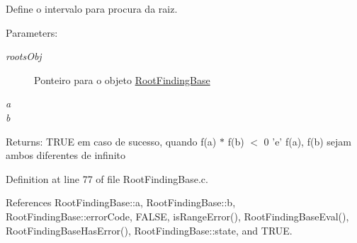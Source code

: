 Define o intervalo para procura da raiz. 

\begin{Desc}
\item[Parameters:]
\begin{description}
\item[{\em rootsObj}]Ponteiro para o objeto \hyperlink{structRootFindingBase}{RootFindingBase} \item[{\em a}]\item[{\em b}]\end{description}
\end{Desc}
\begin{Desc}
\item[Returns:]TRUE em caso de sucesso, quando f(a) $\ast$ f(b) $<$ 0 'e' f(a), f(b) sejam ambos diferentes de infinito \end{Desc}


Definition at line 77 of file RootFindingBase.c.

References RootFindingBase::a, RootFindingBase::b, RootFindingBase::errorCode, FALSE, isRangeError(), RootFindingBaseEval(), RootFindingBaseHasError(), RootFindingBase::state, and TRUE.